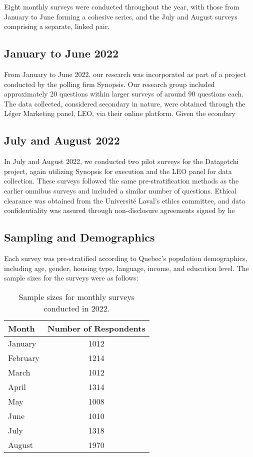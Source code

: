 \documentclass[
  journal=medium,
  manuscript=article-type,
  year=2024
]{cup-journal}
\begin{document}
Eight monthly surveys were conducted throughout the year, with those from January to June forming a cohesive series, and the July and August surveys comprising a separate, linked pair.

\subsection{January to June 2022}
From January to June 2022, our research was incorporated as part of a project conducted by the polling firm Synopsis. Our research group included approximately 20 questions within larger surveys of around 90 questions each. The data collected, considered secondary in nature, were obtained through the Léger Marketing panel, LEO, via their online platform. Given the econdary %

\subsection{July and August 2022}
In July and August 2022, we conducted two pilot surveys for the Datagotchi project, again utilizing Synopsis for execution and the LEO panel for data collection. These surveys followed the same pre-stratification methods as the earlier omnibus surveys and included a similar number of questions. Ethical clearance was obtained from the Université Laval's ethics committee, and data confidentiality was assured through non-disclosure agreements signed by he %


\subsection{Sampling and Demographics}
Each survey was pre-stratified according to Quebec's population demographics, including age, gender, housing type, language, income, and education level. The sample sizes for the surveys were as follows:

\begin{table}[h!]
\centering
\begin{tabular}{|l|c|}
\hline
\textbf{Month} & \textbf{Number of Respondents} \\
\hline
January & 1012 \\
February & 1214 \\
March & 1012 \\
April & 1314 \\
May & 1008 \\
June & 1010 \\
July & 1318 \\
August & 1970 \\
\hline
\end{tabular}
\caption{Sample sizes for monthly surveys conducted in 2022.}
\label{table:survey_samples}
\end{table}
\end{document}
